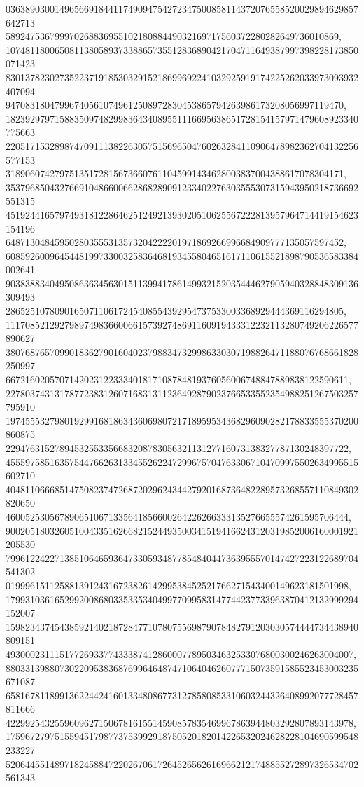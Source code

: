 \documentclass[12pt]{article}
\begin{document}
036389030014965669184411749094754272347500858114372076558520029894629857642713
58924753679997026883695510218088449032169717560372280282649736010869, 
107481180065081138058937338865735512836890421704711649387997398228173850071423
830137823027352237191853032915218699692241032925919174225262033973093932407094
947083180479967405610749612508972830453865794263986173208056997119470, 
182392979715883509748299836434089551116695638651728154157971479608923340775663
220517153289874709111382263057515696504760263284110906478982362704132256577153
318906074279751351728156736607611045991434628003837004388617078304171, 
353796850432766910486600662868289091233402276303555307315943950218736692551315
451924416579749318122864625124921393020510625567222813957964714419154623154196
648713048459502803555313573204222201971869266996684909777135057597452, 
608592600964544819973300325836468193455804651617110615521898790536583384002641
903838834049508636345630151139941786149932152035444627905940328848309136309493
286525107809016507110617245408554392954737533003368929444369116294805, 
111708521292798974983660066157392748691160919433312232113280749206226577890627
380768765709901836279016040237988347329986330307198826471188076768661828250997
6672160205707142023122333401817108784819376056006748847889838122590611, 
227803743131787723831260716831311236492879023766533552354988251267503257795910
197455532798019299168186343606980721718959534368296090282178833555370200860875
2294763152789453255335668320878305632113127716073138327787130248397722, 
455597585163575447662631334552622472996757047633067104709975502634995515602710
404811066685147508237472687202962434427920168736482289573268557110849302820650
4600525305678906510671335641856600264226266333135276655574261595706444, 
900205180326051004335162668215244935003415194166243120319852006160001921205530
799612242271385106465936473305934877854840447363955570147427223122689704541302
0199961511258813912431672382614299538452521766271543400149623181501998, 
179931036165299200868033533534049977099583147744237733963870412132999294152007
159823437454385921402187284771078075569879078482791203030574444734438940809151
49300023111517726933774333874128600077895034632533076800300246263004007, 
880331398807302209538368769964648747106404626077715073591585523453003235671087
658167811899136224424160133480867731278580853310603244326408992077728457811666
42299254325596096271506781615514590857835469967863944803292807893143978, 
175967279751559451798773753992918750520182014226532024628228104690599548233227
520644551489718245884722026706172645265626169662121748855272897326534702561343
\end{document}
